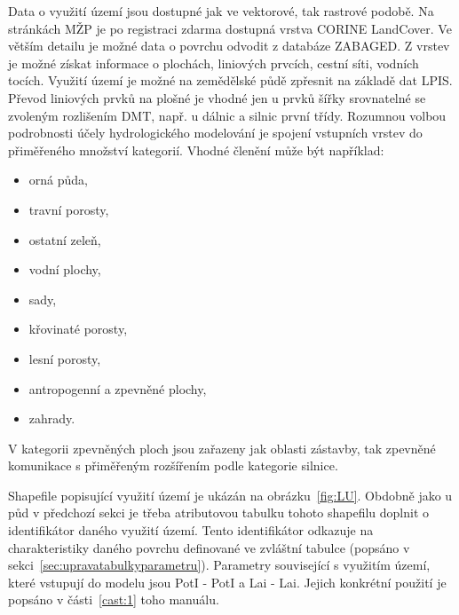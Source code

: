 Data o využití území jsou dostupné jak ve vektorové, tak rastrové podobě. Na stránkách MŽP je po registraci zdarma dostupná vrstva CORINE LandCover. Ve větším detailu je možné data o povrchu odvodit z databáze ZABAGED. Z vrstev je možné získat informace o plochách, liniových prvcích, cestní síti, vodních tocích. Využití území je možné na zemědělské půdě zpřesnit na základě dat LPIS. Převod liniových prvků na plošné je vhodné jen u prvků šířky srovnatelné se zvoleným rozlišením DMT, např. u dálnic a silnic první třídy. Rozumnou volbou podrobnosti účely hydrologického modelování je spojení vstupních vrstev do přiměřeného množství kategorií. Vhodné členění může být například:  
\begin{itemize} \itemsep -3pt
  \item orná půda,
  \item travní porosty,
  \item ostatní zeleň,
  \item vodní plochy,
  \item sady,
  \item křovinaté porosty,
  \item lesní porosty,
  \item antropogenní a zpevněné plochy,
  \item zahrady.
\end{itemize}
V kategorii zpevněných ploch jsou zařazeny jak oblasti zástavby, tak zpevněné komunikace s přiměřeným rozšířením podle kategorie silnice. 

Shapefile popisující využití území je ukázán na obrázku~\ref{fig:LU}. Obdobně jako u půd v předchozí sekci je třeba atributovou tabulku tohoto shapefilu doplnit o identifikátor daného využití území. Tento identifikátor odkazuje na charakteristiky daného povrchu definované ve zvláštní tabulce (popsáno v sekci~\ref{sec:upravatabulkyparametru}). Parametry související s využitím území, které vstupují do modelu jsou \acs{PotI} - \acl{PotI} a \acs{Lai} - \acl{Lai}. Jejich konkrétní použití je popsáno v části~\ref{cast:1} toho manuálu. 
% 
% 
% 
% 















